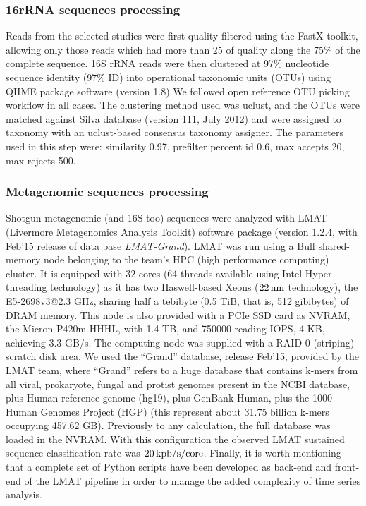 \subsubsection*{16rRNA sequences processing}
Reads from the selected studies were first quality filtered using the FastX toolkit\cite{FASTX}, allowing only those reads which had more than 25 of quality along the 75\% of the complete sequence. 16S rRNA reads were then clustered at 97\% nucleotide sequence identity (97\% ID) into operational taxonomic units (OTUs) using QIIME package software\cite{QIIME} (version 1.8) We followed open reference OTU picking workflow in all cases. The clustering method used was uclust, and the OTUs were matched against Silva database\cite{SILVA} (version 111, July 2012) and were assigned to taxonomy with an uclust-based consensus taxonomy assigner. The parameters used in this step were: similarity 0.97, prefilter percent id 0.6, max accepts 20, max rejects 500. 

\subsubsection*{Metagenomic sequences processing}
Shotgun metagenomic (and 16S too) sequences were analyzed with LMAT (Livermore Metagenomics Analysis Toolkit) software package\cite{LMAT} (version 1.2.4, with Feb'15 release of data base \emph{LMAT-Grand}). LMAT was run using a Bull shared-memory node belonging to the team's HPC (high performance computing) cluster. It is equipped with 32 cores (64 threads available using Intel Hyper-threading technology) as it has two Haswell-based Xeons ($22\operatorname{nm}$ technology), the E5-2698v3@2.3 GHz, sharing half a tebibyte (0.5 TiB, that is, 512 gibibytes) of DRAM memory. This node is also provided with a PCIe SSD card as NVRAM, the Micron P420m HHHL, with 1.4 TB, and 750000 reading IOPS, 4 KB, achieving 3.3 GB/s. The computing node was supplied with a RAID-0 (striping) scratch disk area. We used the ``Grand'' database\cite{LMAT2}, release Feb'15, provided by the LMAT team, where ``Grand'' refers to a huge database that contains k-mers from all viral, prokaryote, fungal and protist genomes present in the NCBI database, plus Human reference genome (hg19), plus GenBank Human, plus the 1000 Human Genomes Project (HGP) (this represent about 31.75 billion k-mers occupying 457.62 GB)\cite{LMAT2}. Previously to any calculation, the full database was loaded in the NVRAM. With this configuration the observed LMAT sustained sequence classification rate was $20\operatorname{kpb/s/core}$. Finally, it is worth mentioning that a complete set of Python scripts have been developed as back-end and front-end of the LMAT pipeline in order to manage the added complexity of time series analysis. 

